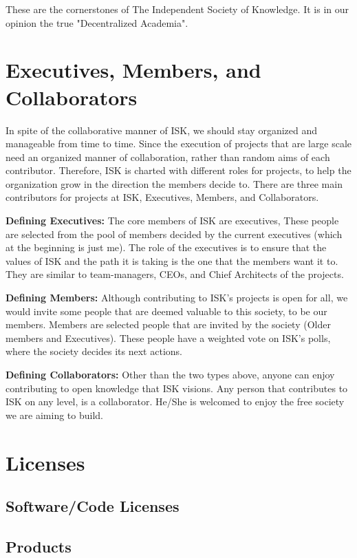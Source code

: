 \documentclass[10pt]{article}
\begin{document}
These are the cornerstones of The Independent Society of Knowledge.
It is in our opinion the true "Decentralized Academia".

\section{Executives, Members, and Collaborators}
In spite of the collaborative manner of ISK, we should stay organized and manageable from time to time.
Since the execution of projects that are large scale need an organized manner of collaboration, rather than random aims of each contributor.
Therefore, ISK is charted with different roles for projects, to help the organization grow in the direction the members decide to.
There are three main contributors for projects at ISK, Executives, Members, and Collaborators.

\textbf{Defining Executives:} The core members of ISK are executives, These people are selected from the pool of members decided by the current executives (which at the beginning is just me).
The role of the executives is to ensure that the values of ISK and the path it is taking is the one that the members want it to.
They are similar to team-managers, CEOs, and Chief Architects of the projects.

\textbf{Defining Members:} Although contributing to ISK's projects is open for all, we would invite some people that are deemed valuable to this society, to be our members.
Members are selected people that are invited by the society (Older members and Executives).
These people have a weighted vote on ISK's polls, where the society decides its next actions.

\textbf{Defining Collaborators:} Other than the two types above, anyone can enjoy contributing to open knowledge that ISK visions.
Any person that contributes to ISK on any level, is a collaborator.
He/She is welcomed to enjoy the free society we are aiming to build.

\section{Licenses}
\subsection{Software/Code Licenses}
\subsection{Products}
\end{document}
